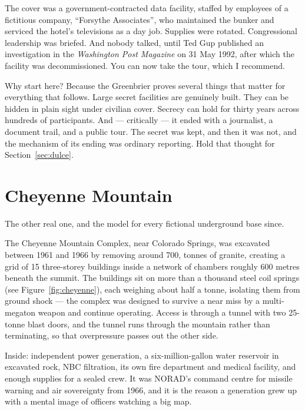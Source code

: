 The cover was a government-contracted data facility, staffed by employees of a fictitious company,
``Forsythe Associates'', who maintained the bunker and serviced the hotel's televisions as a day
job. Supplies were rotated. Congressional leadership was briefed. And nobody talked, until Ted Gup
published an investigation in the \emph{Washington Post Magazine} on 31 May 1992, after which the
facility was decommissioned. You can now take the tour, which I recommend.

Why start here? Because the Greenbrier proves several things that matter for everything that
follows. Large secret facilities are genuinely built. They can be hidden in plain sight under
civilian cover. Secrecy can hold for thirty years across hundreds of participants. And ---
critically --- it ended with a journalist, a document trail, and a public tour. The secret was
kept, and then it was not, and the mechanism of its ending was ordinary reporting. Hold that
thought for Section~\ref{sec:dulce}.

\section{Cheyenne Mountain}\label{sec:cheyennemountain}

The other real one, and the model for every fictional underground base since.

The Cheyenne Mountain Complex, near Colorado Springs, was excavated between 1961 and 1966 by
removing around 700, tonnes of granite, creating a grid of 15 three-storey buildings inside a
network of chambers roughly 600 metres beneath the summit. The buildings sit on more than a thousand steel coil springs (see Figure~\ref{fig:cheyenne}), each weighing about half a tonne, isolating them from ground shock ---
the complex was designed to survive a near miss by a multi-megaton weapon and continue operating.
Access is through a tunnel with two 25-tonne blast doors, and the tunnel runs through the mountain
rather than terminating, so that overpressure passes out the other side.

Inside: independent power generation, a six-million-gallon water reservoir in excavated rock,
NBC filtration, its own fire department and medical facility, and enough supplies for a sealed
crew. It was NORAD's command centre for missile warning and air sovereignty from 1966, and it is
the reason a generation grew up with a mental image of officers watching a big map.

